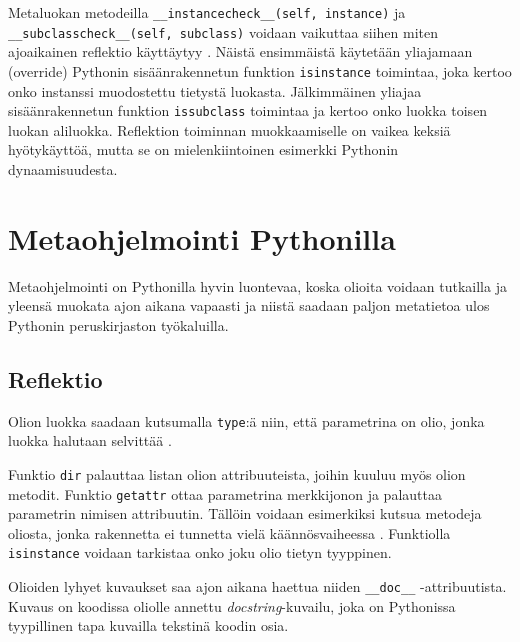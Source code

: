 \documentclass[finnish]{tktltiki2}
\theoremstyle{definition}
\theoremstyle{remark}
\begin{document}
Metaluokan metodeilla \verb|__instancecheck__(self, instance)| ja \verb|__subclasscheck__(self, subclass)| voidaan vaikuttaa siihen miten ajoaikainen reflektio käyttäytyy \cite{magic-methods, Python-docs}. Näistä ensimmäistä käytetään yliajamaan (override) Pythonin sisäänrakennetun funktion \verb|isinstance| toimintaa, joka kertoo onko instanssi muodostettu tietystä luokasta. Jälkimmäinen yliajaa sisäänrakennetun funktion \verb|issubclass| toimintaa ja kertoo onko luokka toisen luokan aliluokka. Reflektion toiminnan muokkaamiselle on vaikea keksiä hyötykäyttöä, mutta se on mielenkiintoinen esimerkki Pythonin dynaamisuudesta.



\section{Metaohjelmointi Pythonilla}

Metaohjelmointi on Pythonilla hyvin luontevaa, koska olioita voidaan tutkailla ja yleensä muokata ajon aikana vapaasti ja niistä saadaan paljon metatietoa ulos Pythonin peruskirjaston työkaluilla.


\subsection{Reflektio}



Olion luokka saadaan kutsumalla \verb|type|:ä niin, että parametrina on olio, jonka luokka halutaan selvittää \cite{dive-into-python}. 

Funktio \verb|dir| palauttaa listan olion attribuuteista, joihin kuuluu myös olion metodit. Funktio \verb|getattr| ottaa parametrina merkkijonon ja palauttaa parametrin nimisen attribuutin. Tällöin voidaan esimerkiksi kutsua metodeja oliosta, jonka rakennetta ei tunnetta vielä käännösvaiheessa \cite{dive-into-python}. Funktiolla \verb|isinstance| voidaan tarkistaa onko joku olio tietyn tyyppinen. 

Olioiden lyhyet kuvaukset saa ajon aikana haettua niiden \verb|__doc__| -attribuutista. Kuvaus on koodissa oliolle annettu \emph{docstring}-kuvailu, joka on Pythonissa tyypillinen tapa kuvailla tekstinä koodin osia.
\end{document}
